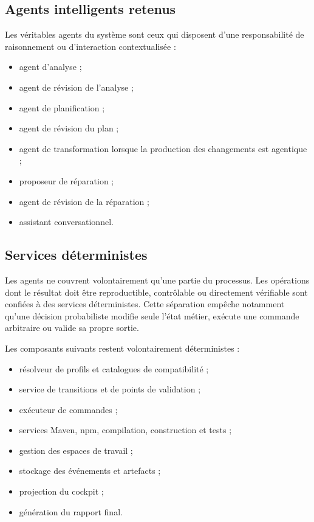 \subsection{Agents intelligents retenus}

Les véritables agents du système sont ceux qui disposent d'une responsabilité de raisonnement ou d'interaction contextualisée :

\begin{itemize}
    \item agent d'analyse ;
    \item agent de révision de l'analyse ;
    \item agent de planification ;
    \item agent de révision du plan ;
    \item agent de transformation lorsque la production des changements est agentique ;
    \item proposeur de réparation ;
    \item agent de révision de la réparation ;
    \item assistant conversationnel.
\end{itemize}

\subsection{Services déterministes}

Les agents ne couvrent volontairement qu'une partie du processus. Les opérations dont le résultat doit être reproductible, contrôlable ou directement vérifiable sont confiées à des services déterministes. Cette séparation empêche notamment qu'une décision probabiliste modifie seule l'état métier, exécute une commande arbitraire ou valide sa propre sortie.

Les composants suivants restent volontairement déterministes :

\begin{itemize}
    \item résolveur de profils et catalogues de compatibilité ;
    \item service de transitions et de points de validation ;
    \item exécuteur de commandes ;
    \item services Maven, npm, compilation, construction et tests ;
    \item gestion des espaces de travail ;
    \item stockage des événements et artefacts ;
    \item projection du cockpit ;
    \item génération du rapport final.
\end{itemize}

